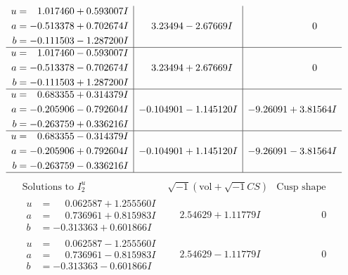 \documentclass[1p]{elsarticle_modified}
\theoremstyle{definition}
\newcommand{\I}{\sqrt{-1}}
\begin{document}
$$\begin{array}{c|c|c}
\begin{aligned}
u &= \phantom{-}1.017460 + 0.593007 I \\
a &= -0.513378 + 0.702674 I \\
b &= -0.111503 - 1.287200 I\end{aligned}
 & \phantom{-}3.23494 - 2.67669 I & \phantom{-0.000000 } 0 \\ \hline\begin{aligned}
u &= \phantom{-}1.017460 - 0.593007 I \\
a &= -0.513378 - 0.702674 I \\
b &= -0.111503 + 1.287200 I\end{aligned}
 & \phantom{-}3.23494 + 2.67669 I & \phantom{-0.000000 } 0 \\ \hline\begin{aligned}
u &= \phantom{-}0.683355 + 0.314379 I \\
a &= -0.205906 - 0.792604 I \\
b &= -0.263759 + 0.336216 I\end{aligned}
 & -0.104901 - 1.145120 I & -9.26091 + 3.81564 I \\ \hline\begin{aligned}
u &= \phantom{-}0.683355 - 0.314379 I \\
a &= -0.205906 + 0.792604 I \\
b &= -0.263759 - 0.336216 I\end{aligned}
 & -0.104901 + 1.145120 I & -9.26091 - 3.81564 I\\
 \hline 
 \end{array}$$\newpage$$\begin{array}{c|c|c}  
\text{Solutions to }I^u_{2}& \I (\text{vol} + \sqrt{-1}CS) & \text{Cusp shape}\\
 \hline 
\begin{aligned}
u &= \phantom{-}0.062587 + 1.255560 I \\
a &= \phantom{-}0.736961 + 0.815983 I \\
b &= -0.313363 + 0.601866 I\end{aligned}
 & \phantom{-}2.54629 + 1.11779 I & \phantom{-0.000000 } 0 \\ \hline\begin{aligned}
u &= \phantom{-}0.062587 - 1.255560 I \\
a &= \phantom{-}0.736961 - 0.815983 I \\
b &= -0.313363 - 0.601866 I\end{aligned}
 & \phantom{-}2.54629 - 1.11779 I & \phantom{-0.000000 } 0 \\ \hline\begin{aligned}

\end{aligned}
\end{array}$$
\end{document}
